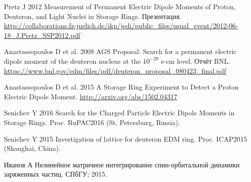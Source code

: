 \documentclass{article}
\begin{document}
	\clearpage
	\begin{thebibliography}{99}
		Pretz J 2012 Measurement of Permanent Electric Dipole Moments of Proton, Deuteron, and Light Nuclei in Storage Rings. Презентация. \url{http://collaborations.fz-juelich.de/ikp/jedi/public_files/usual_event/2012-06-18_J.Pretz_SSP2012.pdf}
		
		Anastassopoulos D et al. 2008 AGS Proposal: Search for a permanent electric dipole moment of the deuteron nucleus at the $10^{-29}$ e$\cdot$cm level. Отчёт BNL. \url{https://www.bnl.gov/edm/files/pdf/deuteron_proposal_080423_final.pdf}
		
		Anastassopoulos D et al. 2015 A Storage Ring Experiment to Detect a Proton Electric Dipole Moment. \url{http://arxiv.org/abs/1502.04317}
		
		Senichev Y 2016 Search for the Charged Particle Electric Dipole Moments in Storage Rings. Proc. RuPAC2016 (St. Petersburg, Russia).

		Senichev Y 2015 Investigation of lattice for deuteron EDM ring. Proc. ICAP2015 (Shanghai, China).
		
		Иванов А Нелинейное матричное интегрирование спин-орбитальной динамики заряженных частиц. СПбГУ; 2015.
	\end{thebibliography}
\end{document}
